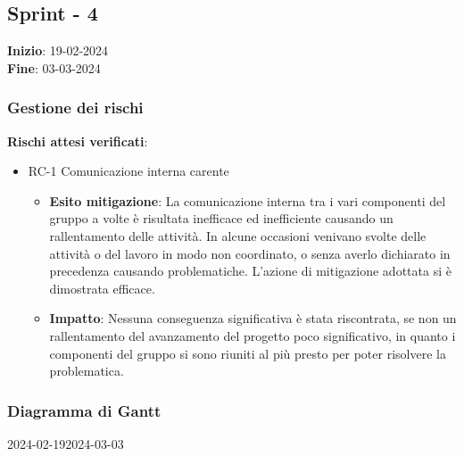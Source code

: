 \subsection{Sprint - 4}

\textbf{Inizio}: 19-02-2024 \\
\textbf{Fine}: 03-03-2024

\subsubsection{Gestione dei rischi}
\textbf{Rischi attesi verificati}:

\begin{itemize}
	\item RC-1 Comunicazione interna carente
	\begin{itemize}
		\item \textbf{Esito mitigazione}: La comunicazione interna tra i vari componenti del gruppo a volte è risultata inefficace ed inefficiente causando un rallentamento delle attività.
		In alcune occasioni venivano svolte delle attività o del lavoro in modo non coordinato, o senza averlo dichiarato in precedenza causando problematiche.
		L'azione di mitigazione adottata si è dimostrata efficace.
		\item \textbf{Impatto}: Nessuna conseguenza significativa è stata riscontrata, se non un rallentamento del avanzamento del progetto poco significativo, in quanto
		i componenti del gruppo si sono riuniti al più presto per poter risolvere la problematica.
	\end{itemize}	
\end{itemize}  

\subsubsection{Diagramma di Gantt}

\begin{ganttchart}[
		x unit=0.6cm, %
		y unit chart=0.6cm,
		bar/.style={fill=blue!50},
		bar height=0.5,
		time slot format=isodate,
		time slot unit=day,
		vgrid,
		today=2024-02-19,
		today rule/.style={draw=red, ultra thick}
	]{2024-02-19}{2024-03-03}
	 \\
	 \\
	 \\
	 \\	
	 \\
\end{ganttchart}


